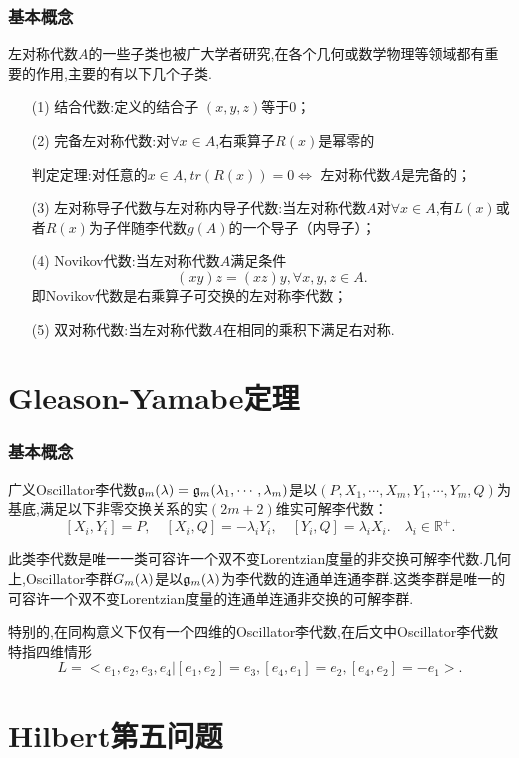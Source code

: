 \documentclass[aspectratio=169, 10pt, utf8, mathserif]{beamer}
\begin{document}
\begin{frame}
	\frametitle{基本概念}
	左对称代数$A$的一些子类也被广大学者研究,在各个几何或数学物理等领域都有重要的作用,主要的有以下几个子类.

	\begin{itemize}
	  \item[(1)] 结合代数:定义的结合子 $(x,y,z)$等于0；
	  \item[(2)] 完备左对称代数:对$\forall x\in A$,右乘算子$R(x)$是幂零的
	  
	  \begin{center}
		判定定理:对任意的$x\in A, tr(R(x))=0 \Leftrightarrow$ 左对称代数$A$是完备的；
	  \end{center}
	  \item[(3)] 左对称导子代数与左对称内导子代数:当左对称代数$A$对$\forall x\in A$,有$L(x)$或者$R(x)$为子伴随李代数$g(A)$的一个导子（内导子）；
	  \item[(4)] Novikov代数:当左对称代数$A$满足条件
	  $$(xy)z=(xz)y,\forall x,y,z\in A.$$即Novikov代数是右乘算子可交换的左对称李代数；
	  \item[(5)] 双对称代数:当左对称代数$A$在相同的乘积下满足右对称.
	\end{itemize}
\end{frame}

\section{Gleason-Yamabe定理}
\begin{frame}
	\frametitle{基本概念}
	\begin{definition}
	广义Oscillator李代数$\mathfrak{g}_m(\boldmath{\lambda})=\mathfrak{g}_m(\lambda_1,\cdots,\lambda_m)$是以$(P,X_1,\cdots,X_m,Y_1,\cdots,Y_m,Q)$为基底,满足以下非零交换关系的实$(2m+2)$维实可解李代数：
	$$ [X_i,Y_i]=P,\quad [X_i,Q]=-\lambda_iY_i,\quad [Y_i,Q]=\lambda_iX_i .\quad \lambda_i\in\mathbb{R}^+.  $$
    \end{definition}
此类李代数是唯一一类可容许一个双不变Lorentzian度量的非交换可解李代数.几何上,Oscillator李群$G_m(\boldmath{\lambda})$是以$\mathfrak{g}_m(\boldmath{\lambda})$为李代数的连通单连通李群.这类李群是唯一的可容许一个双不变Lorentzian度量的连通单连通非交换的可解李群.

特别的,在同构意义下仅有一个四维的Oscillator李代数,在后文中Oscillator李代数特指四维情形	
$$L=<e_1,e_2,e_3,e_4|[e_1,e_2]=e_3,[e_4,e_1]=e_2,[e_4,e_2]=-e_1>.$$
\end{frame}

\section{Hilbert第五问题}
\end{document}
